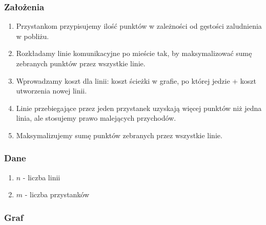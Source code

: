 \documentclass[12pt,a4paper]{article}
\begin{document}
\subsubsection{Założenia}

\begin{enumerate}
    \item Przystankom przypisujemy ilość punktów w zależności od gęstości zaludnienia w pobliżu.
    \item Rozkładamy linie komunikacyjne po mieście tak, by maksymalizować sumę zebranych punktów przez wszystkie linie.
    \item Wprowadzamy koszt dla linii: koszt ścieżki w grafie, po której jedzie + koszt utworzenia nowej linii.
    \item Linie przebiegające przez jeden przystanek uzyskają więcej punktów niż jedna linia, ale stosujemy prawo malejących przychodów.
    \item Maksymalizujemy sumę punktów zebranych przez wszystkie linie.
\end{enumerate}

\subsubsection{Dane}
\begin{enumerate}
    \item $n$ - liczba linii
    \item $m$ - liczba przystanków
\end{enumerate}

\subsubsection{Graf}
\end{document}
